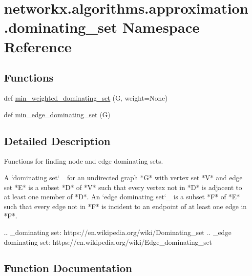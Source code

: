 \hypertarget{namespacenetworkx_1_1algorithms_1_1approximation_1_1dominating__set}{}\section{networkx.\+algorithms.\+approximation.\+dominating\+\_\+set Namespace Reference}
\label{namespacenetworkx_1_1algorithms_1_1approximation_1_1dominating__set}
\subsection*{Functions}
\begin{DoxyCompactItemize}
\item 
def \hyperlink{namespacenetworkx_1_1algorithms_1_1approximation_1_1dominating__set_a5404da3f7c2e2af8fa3f63875171a1c2}{min\+\_\+weighted\+\_\+dominating\+\_\+set} (G, weight=None)
\item 
def \hyperlink{namespacenetworkx_1_1algorithms_1_1approximation_1_1dominating__set_a3ae6f0613bd8caf029105533b436a1be}{min\+\_\+edge\+\_\+dominating\+\_\+set} (G)
\end{DoxyCompactItemize}


\subsection{Detailed Description}
\begin{DoxyVerb}Functions for finding node and edge dominating sets.

A `dominating set`_ for an undirected graph *G* with vertex set *V*
and edge set *E* is a subset *D* of *V* such that every vertex not in
*D* is adjacent to at least one member of *D*. An `edge dominating set`_
is a subset *F* of *E* such that every edge not in *F* is
incident to an endpoint of at least one edge in *F*.

.. _dominating set: https://en.wikipedia.org/wiki/Dominating_set
.. _edge dominating set: https://en.wikipedia.org/wiki/Edge_dominating_set\end{DoxyVerb}
 

\subsection{Function Documentation}
\mbox{\label{namespacenetworkx_1_1algorithms_1_1approximation_1_1dominating__set_a3ae6f0613bd8caf029105533b436a1be}} 
